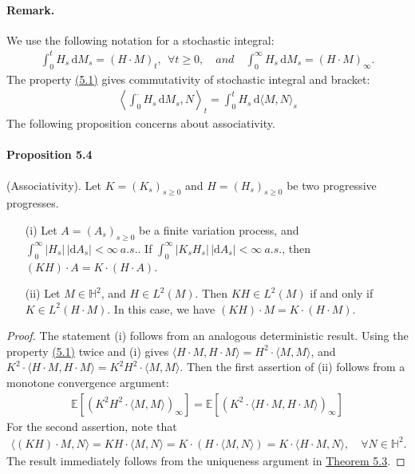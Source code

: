 \documentclass{article}
\numberwithin{equation}{section}
\newcommand{\E}{\mathbb{E}}
\renewcommand{\d}{\mathrm{d}}
\theoremstyle{plain}
\theoremstyle{definition}
\begin{document}
\paragraph{Remark.} We use the following notation for a stochastic integral:
\begin{align*}
	\int_0^t H_s\,\d M_s = (H\cdot M)_t,\ \ \forall t\geq 0,\quad\textit{and}\quad \int_0^\infty H_s\,\d M_s = (H\cdot M)_\infty.
\end{align*}
The property \hyperref[eq:5.1]{(5.1)} gives commutativity of stochastic integral and bracket:
\begin{align*}
	\left\langle \int_0^\cdot H_s\,\d M_s, N\right\rangle_t = \int_0^t H_s\,\d \langle M,N\rangle_s
\end{align*}
The following proposition concerns about associativity.

\paragraph{Proposition 5.4\label{prop:5.4}} (Associativity). Let $K=(K_s)_{s\geq 0}$ and $H=(H_s)_{s\geq 0}$ be two progressive progresses.
\begin{itemize}
	\item[(i)] Let $A=(A_s)_{s\geq 0}$ be a finite variation process, and $\int_0^\infty\vert H_s\vert\,\vert\d A_s\vert<\infty\ a.s.$. If $\int_0^\infty\vert K_sH_s\vert\,\vert\d A_s\vert<\infty\ a.s.$, then $(KH)\cdot A = K\cdot(H\cdot A)$.
	\item[(ii)] Let $M\in\mathbb{H}^2$, and $H\in L^2(M)$. Then $KH\in L^2(M)$ if and only if $K\in L^2(H\cdot M)$. In this case, we have $(KH)\cdot M = K\cdot(H\cdot M)$.
\end{itemize}
\begin{proof}
The statement (i) follows from an analogous deterministic result. Using the property \hyperref[eq:5.1]{(5.1)} twice and (i) gives $\langle H\cdot M,H\cdot M\rangle = H^2\cdot\langle M,M\rangle$, and $K^2\cdot\langle H\cdot M,H\cdot M\rangle = K^2H^2\cdot\langle M,M\rangle$. Then the first assertion of (ii) follows from a monotone convergence argument:
\begin{align*}
	\E\left[\left(K^2H^2\cdot\langle M,M\rangle\right)_\infty\right] = \E\left[\left(K^2\cdot\langle H\cdot M,H\cdot M\rangle\right)_\infty\right]
\end{align*}
For the second assertion, note that
\begin{align*}
	\langle (KH)\cdot M,N\rangle = KH\cdot \langle M,N\rangle = K\cdot(H\cdot\langle M,N\rangle) = K\cdot\langle H\cdot M,N\rangle,\quad\forall N\in\mathbb{H}^2.
\end{align*}
The result immediately follows from the uniqueness argument in \hyperref[thm:5.3]{Theorem 5.3}.
\end{proof}
\end{document}
